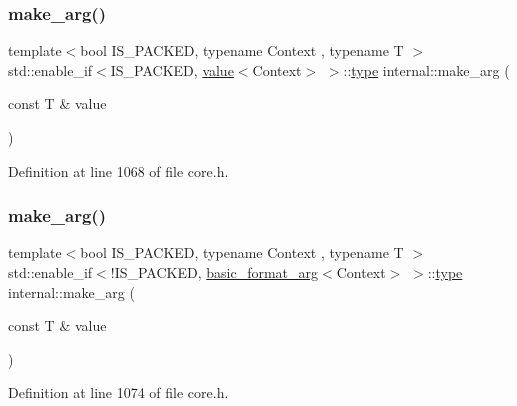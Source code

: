 \subsubsection{\texorpdfstring{make\+\_\+arg()}{make\_arg()}\hspace{0.1cm}{\footnotesize\ttfamily [2/3]}}
{\footnotesize\ttfamily template$<$bool I\+S\+\_\+\+P\+A\+C\+K\+ED, typename Context , typename T $>$ \\
std\+::enable\+\_\+if$<$I\+S\+\_\+\+P\+A\+C\+K\+ED, \hyperlink{classinternal_1_1value}{value}$<$Context$>$ $>$\+::\hyperlink{namespaceinternal_a8661864098ac0acff9a6dd7e66f59038}{type} internal\+::make\+\_\+arg (\begin{DoxyParamCaption}\item[{const T \&}]{value }\end{DoxyParamCaption})\hspace{0.3cm}{\ttfamily [inline]}}



Definition at line 1068 of file core.\+h.

\mbox{\label{namespaceinternal_a588cd6ff21216b089465cc97c74e0df5}} 
\subsubsection{\texorpdfstring{make\+\_\+arg()}{make\_arg()}\hspace{0.1cm}{\footnotesize\ttfamily [3/3]}}
{\footnotesize\ttfamily template$<$bool I\+S\+\_\+\+P\+A\+C\+K\+ED, typename Context , typename T $>$ \\
std\+::enable\+\_\+if$<$!I\+S\+\_\+\+P\+A\+C\+K\+ED, \hyperlink{classbasic__format__arg}{basic\+\_\+format\+\_\+arg}$<$Context$>$ $>$\+::\hyperlink{namespaceinternal_a8661864098ac0acff9a6dd7e66f59038}{type} internal\+::make\+\_\+arg (\begin{DoxyParamCaption}\item[{const T \&}]{value }\end{DoxyParamCaption})\hspace{0.3cm}{\ttfamily [inline]}}



Definition at line 1074 of file core.\+h.

\mbox{\label{namespaceinternal_aca83fc7269ad3f336a18bbea14255a99}} 
